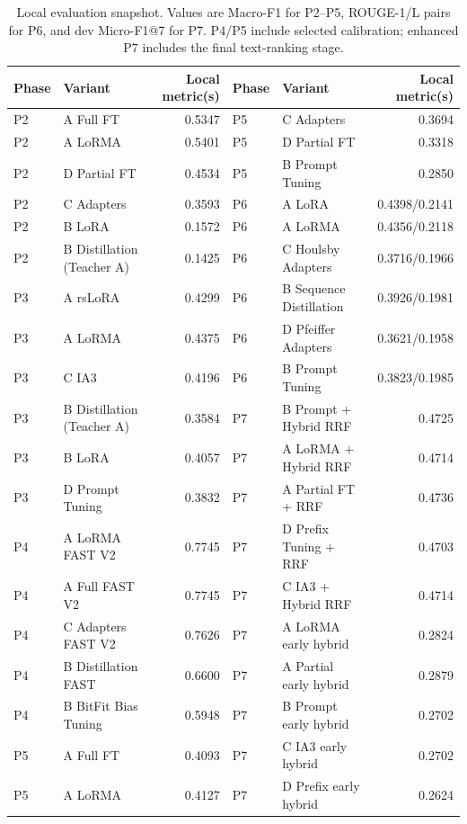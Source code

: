 \documentclass[11pt, oneside]{article}
\begin{document}
\begin{table}[htbp]\centering\scriptsize
\caption{Local evaluation snapshot. Values are Macro-F1 for P2--P5,
ROUGE-1/L pairs for P6, and dev Micro-F1@7 for P7. P4/P5 include selected
calibration; enhanced P7 includes the final text-ranking stage.}
\setlength{\tabcolsep}{3pt}
\begin{tabular}{llrllr}\toprule
Phase & Variant & Local metric(s) & Phase & Variant & Local metric(s)\\\midrule
P2 & A Full FT & 0.5347 & P5 & C Adapters & 0.3694 \\
P2 & A LoRMA & 0.5401 & P5 & D Partial FT & 0.3318 \\
P2 & D Partial FT & 0.4534 & P5 & B Prompt Tuning & 0.2850 \\
P2 & C  Adapters & 0.3593 & P6 & A LoRA & 0.4398/0.2141 \\
P2 & B LoRA & 0.1572 & P6 & A LoRMA & 0.4356/0.2118 \\
P2 & B Distillation (Teacher A) & 0.1425 & P6 & C Houlsby Adapters & 0.3716/0.1966 \\
P3 & A rsLoRA & 0.4299 & P6 & B Sequence Distillation & 0.3926/0.1981 \\
P3 & A LoRMA & 0.4375 & P6 & D Pfeiffer Adapters & 0.3621/0.1958 \\
P3 & C IA3 & 0.4196 & P6 & B Prompt Tuning & 0.3823/0.1985 \\
P3 & B Distillation (Teacher A) & 0.3584 & P7 & B Prompt + Hybrid RRF & 0.4725 \\
P3 & B LoRA & 0.4057 & P7 & A LoRMA + Hybrid RRF & 0.4714 \\
P3 & D Prompt Tuning & 0.3832 & P7 & A Partial FT + RRF & 0.4736 \\
P4 & A LoRMA FAST V2 & 0.7745 & P7 & D Prefix Tuning + RRF & 0.4703 \\
P4 & A Full FAST V2 & 0.7745 & P7 & C IA3 + Hybrid RRF & 0.4714 \\
P4 & C Adapters FAST V2 & 0.7626 & P7 & A LoRMA early hybrid & 0.2824 \\
P4 & B Distillation FAST & 0.6600 & P7 & A Partial early hybrid & 0.2879 \\
P4 & B BitFit Bias Tuning & 0.5948 & P7 & B Prompt early hybrid & 0.2702 \\
P5 & A Full FT & 0.4093 & P7 & C IA3 early hybrid & 0.2702 \\
P5 & A LoRMA & 0.4127 & P7 & D Prefix early hybrid & 0.2624 \\
\bottomrule\end{tabular}\end{table}
\end{document}
